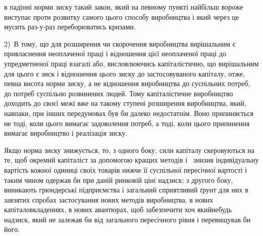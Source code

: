 \parcont{}  %
в падінні норми зиску такий закон, який на певному пункті
найбільш вороже виступає проти розвитку самого цього способу
виробництва і який через це мусить раз-у-раз переборюватись
кризами.

2)~В тому, що для розширення чи скорочення виробництва
вирішальним є привласнення неоплаченої праці і відношення цієї
неоплаченої праці до упредметненої праці взагалі або, висловлюючись
капіталістично, що вирішальним для цього є зиск
і відношення цього зиску до застосовуваного капіталу, отже,
певна висота норми зиску, а не відношення виробництва до
суспільних потреб, до потреб суспільно розвинених людей. Тому
капіталістичне виробництво доходить до своєї межі вже на
такому ступені розширення виробництва, який, навпаки, при
інших передумовах був би далеко недостатнім. Воно припиняється
не тоді, коли цього вимагає задоволення потреб, а тоді,
коли цього припинення вимагає виробництво і реалізація зиску.

Якщо норма зиску знижується, то, з одного боку, сили
капіталу скеровуються на те, щоб окремий капіталіст за допомогою
кращих методів і~ знизив індивідуальну вартість
кожної одиниці своїх товарів нижче її суспільної пересічної
вартості і таким чином одержав би при даній ринковій ціні
надзиск; з другого боку, виникають грюндерські підприємства
і загальний сприятливий ґрунт для них в завзятих спробах застосування
нових методів виробництва, в нових капіталовкладеннях,
в нових авантюрах, щоб забезпечити хоч якийнебудь
надзиск, який не залежав би від загального пересічного рівня
і перевищував би його.


